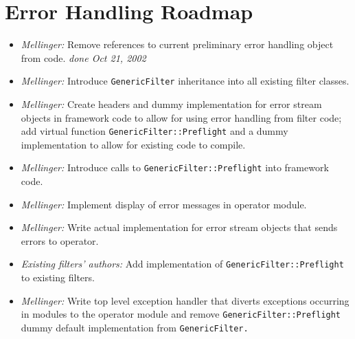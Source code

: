 \documentclass[12pt,a4paper]{article}
\begin{document}
\pagebreak
\section{Error Handling Roadmap}
\begin{flushleft}
\begin{itemize}
\item \textit{Mellinger:} Remove references to current preliminary error handling
object from code. \textit{done Oct 21, 2002}
\item \textit{Mellinger:} Introduce \texttt{GenericFilter} inheritance into all
existing filter classes.
\item \textit{Mellinger:} Create headers and dummy implementation for error stream
objects in framework code to allow for using error handling from
filter code; add virtual function \texttt{GenericFilter::Preflight}
and a dummy implementation to allow for existing code to compile.
\item \textit{Mellinger:} Introduce calls to \texttt{GenericFilter::Preflight} into
framework code.
\item \textit{Mellinger:} Implement display of error messages in operator module.
\item \textit{Mellinger:} Write actual implementation for error stream objects that
sends errors to operator.
\item \textit{Existing filters' authors:} Add implementation of \texttt{GenericFilter::Preflight} to
existing filters.
\item \textit{Mellinger:} Write top level exception handler that diverts exceptions
occurring in modules to the operator module and remove \texttt{GenericFilter::Preflight} dummy default implementation from
\texttt{GenericFilter.}
\end{itemize}
\end{flushleft}
\end{document}
